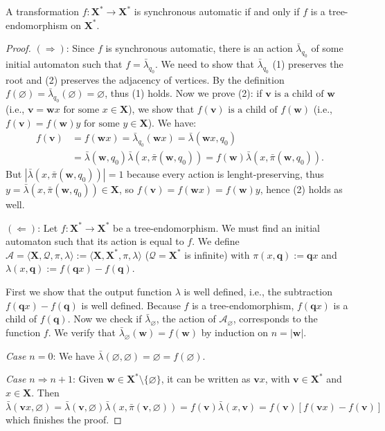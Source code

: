 \documentclass[mat1]{fmfdeloTS2.0}
\newcommand{\obs}{}				%
\newcommand{\word}{\mathbf}				%
\newcommand{\abece}{\mathbf{X}}			%
\newcommand{\fslovar}{\mathbf{X^*}}		%
\newcommand{\auto}{\mathcal}			%
\newcommand{\QQ}{\mathcal{Q}}			%
\newcommand{\PI}{\bar{\pi}}			%
\newcommand{\LAMBDA}{\bar{\lambda}}			%
\begin{document}
\begin{proposition}\label{prop:equivalence tree-morph and semisynaut}
A transformation $f:\fslovar\longrightarrow\fslovar$ is synchronous automatic \obs{if and only if} $f$ is a tree-endomorphism on $\fslovar$.
\end{proposition}
\begin{proof}
\emph{$(\Rightarrow)$}: Since $f$ is synchronous automatic, there is an action $\LAMBDA_{q_0}$ of some initial automaton such that $f=\LAMBDA_{q_0}$. We need to show that $\LAMBDA_{q_0}$ (1) preserves the root and (2) preserves the adjacency of vertices. 
By the definition $f(\varnothing)=\LAMBDA_{q_0}(\varnothing)=\varnothing$, thus (1) holds. 
Now we prove (2): if $\word{v}\text{ is a child of }\word{w}$ (i.e., $\word{v}=\word{w}x\text{ for some }x\in\abece$), we show that $f(\word{v})\text{ is a child of }f(\word{w})$ (i.e., $f(\word{v})=f(\word{w})y\text{ for some }y\in\abece$). We have:
\begin{align*}
f(\word{v})&=f(\word{w}x)=\LAMBDA_{q_0}(\word{w}x)=\LAMBDA(\word{w}x,q_0)
\\
&=\LAMBDA(\word{w},q_0)\LAMBDA(x,\PI(\word{w},q_0))=f(\word{w})\LAMBDA(x,\PI(\word{w},q_0)).
\end{align*}
But $|\LAMBDA(x,\PI(\word{w},q_0))|=1$ because every action is lenght-preserving, thus $y=\LAMBDA(x,\PI(\word{w},q_0))\in\abece$, so $f(\word{v})=f(\word{w}x)=f(\word{w})y$, hence (2) holds as well.

\smallskip

\emph{$(\Leftarrow)$}: Let $f:\fslovar\longrightarrow\fslovar$ be a tree-endomorphism. We must find an initial automaton such that its action is equal to $f$. We define $\auto{A}=\langle \abece,\QQ,\pi,\lambda\rangle :=\langle \abece,\fslovar,\pi,\lambda\rangle$ ($\QQ=\fslovar$ is \obs{infinite}) with $\pi(x,\word{q}):=\word{q}x$ and $\lambda(x,\word{q}):=f(\word{q}x)-f(\word{q})$. 

First we show that the output function $\lambda$ is well defined, i.e., the subtraction $f(\word{q}x)-f(\word{q})$ is well defined. Because $f$ is a tree-endomorphism, $f(\word{q}x)$ is a child of $f(\word{q})$. 
Now we check if $\LAMBDA_{\varnothing}$, the action of $\auto{A}_{\varnothing}$, corresponds to the function $f$. We verify that $\LAMBDA_{\varnothing}(\word{w})=f(\word{w})$ by induction on $n=|\word{w}|$.

\emph{Case $n=0$}: We have $\LAMBDA(\varnothing,\varnothing)=\varnothing=f(\varnothing)$. 

\emph{Case $n\Rightarrow n+1$}: Given $\word{w}\in\fslovar\setminus\{\varnothing\}$, it can be written as $\word{v}x$, with $\word{v}\in\fslovar$ and $x\in\abece$. 
Then $\LAMBDA(\word{v}x,\varnothing)=\LAMBDA(\word{v},\varnothing)\LAMBDA(x,\PI(\word{v},\varnothing))=f(\word{v})\LAMBDA(x,\word{v})=f(\word{v})[f(\word{v}x)-f(\word{v})] $ which finishes the proof.
\end{proof}
\end{document}
